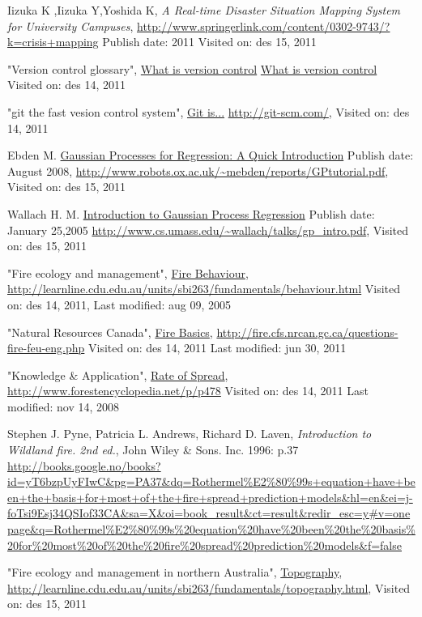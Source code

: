 \begin{thebibliography}{4}
 Iizuka K ,Iizuka Y,Yoshida K, \emph{A Real-time Disaster Situation Mapping System for University Campuses}, \url{http://www.springerlink.com/content/0302-9743/?k=crisis+mapping} Publish date: 2011 Visited on: des 15, 2011

 "Version control glossary", \underline{What is version control} \url{What is version control} Visited on: des 14, 2011

 "git the fast vesion control system", \underline{Git is...} \url{http://git-scm.com/}, Visited on: des 14, 2011

 Ebden M. \underline{Gaussian Processes for Regression: A Quick Introduction} Publish date: August 2008, \url{http://www.robots.ox.ac.uk/~mebden/reports/GPtutorial.pdf}, Visited on: des 15, 2011

 Wallach H. M. \underline{Introduction to Gaussian Process Regression}
Publish date: January 25,2005
\url{http://www.cs.umass.edu/~wallach/talks/gp_intro.pdf}, Visited on: des 15, 2011

 "Fire ecology and management", \underline{Fire Behaviour}, \url{http://learnline.cdu.edu.au/units/sbi263/fundamentals/behaviour.html}
Visited on: des 14, 2011, Last modified: aug 09, 2005

 "Natural Resources Canada", \underline{Fire Basics}, \url{http://fire.cfs.nrcan.gc.ca/questions-fire-feu-eng.php} Visited on: des 14, 2011
Last modified: jun 30, 2011

 "Knowledge & Application", \underline{Rate of Spread}, \url{http://www.forestencyclopedia.net/p/p478} Visited on: des 14, 2011
Last modified: nov 14, 2008

 Stephen J. Pyne, Patricia L. Andrews, Richard D. Laven, \emph{Introduction to Wildland fire. 2nd ed.}, John Wiley & Sons. Inc. 1996: p.37
\url{http://books.google.no/books?id=yT6bzpUyFIwC&pg=PA37&dq=Rothermel%E2%80%99s+equation+have+been+the+basis+for+most+of+the+fire+spread+prediction+models&hl=en&ei=j-foTsi9Esj34QSIof33CA&sa=X&oi=book_result&ct=result&redir_esc=y#v=onepage&q=Rothermel%E2%80%99s%20equation%20have%20been%20the%20basis%20for%20most%20of%20the%20fire%20spread%20prediction%20models&f=false}

 "Fire ecology and management in northern Australia", \underline{Topography}, \url{http://learnline.cdu.edu.au/units/sbi263/fundamentals/topography.html}, 
Visited on: des 15, 2011


\end{thebibliography}
